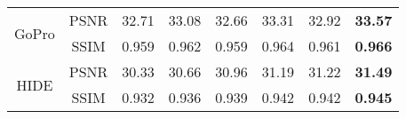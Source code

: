 \documentclass[runningheads]{llncs}
\begin{document}
\begin{table}[t]
{\begin{tabular}{c|c|cc|cc|cc}
\multirow{2}{*}{{GoPro}}   & PSNR                    & 32.71                 & {33.08} & 32.66                   & {33.31}    & 32.92                      & \textbf{33.57}   \\
                         & SSIM                    & 0.959                 & {0.962}  & 0.959                   & {0.964} & 0.961                      & \textbf{0.966}  \\ \midrule
\multirow{2}{*}{{HIDE}}    & PSNR                    & 30.33                 & {30.66}   & 30.96                   & {31.19}    & 31.22                      & \textbf{31.49}   \\
                         & SSIM                    & 0.932                 & {0.936}  & 0.939                   & {0.942}   & 0.942                      & \textbf{0.945}  \\\bottomrule
\end{tabular}
}
\end{table} 
\end{document}
